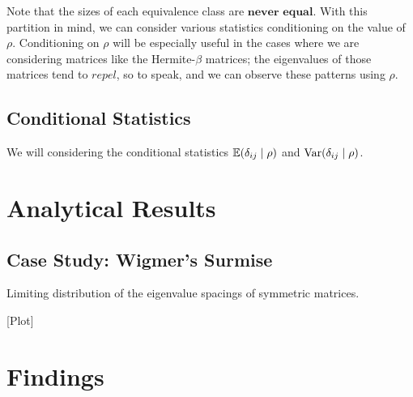 Note that the sizes of each equivalence class are $\textbf{never equal}$. With this partition in mind, we can consider various statistics conditioning on the value of $\rho$. Conditioning on $\rho$ will be especially useful in the cases where we are considering matrices like the Hermite-$\beta$ matrices; the eigenvalues of those matrices tend to $\textit{repel}$, so to speak, and we can observe these patterns using $\rho$.

\subsection{Conditional Statistics}

We will considering the conditional statistics $\mathbb{E}(\delta_{ij} \mid \rho)$ and $\text{Var}(\delta_{ij} \mid \rho)$.


\section{Analytical Results}


\subsection{Case Study: Wigmer's Surmise}

Limiting distribution of the eigenvalue spacings of symmetric matrices.

[Plot]


\section{Findings}
